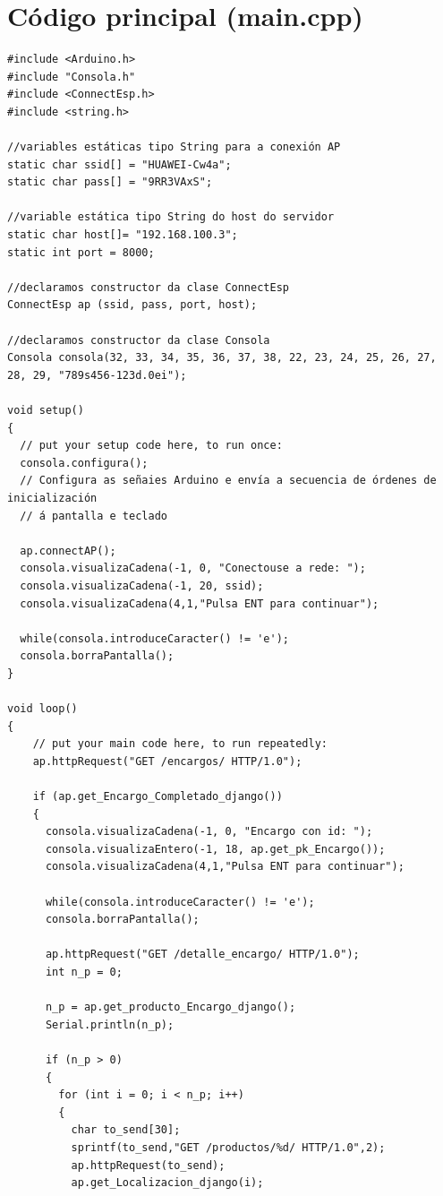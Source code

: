 \documentclass[11pt,twoside]{book}
\begin{document}
\section{Código principal (main.cpp)}

\begin{lstlisting}
#include <Arduino.h>
#include "Consola.h"
#include <ConnectEsp.h>
#include <string.h>

//variables estáticas tipo String para a conexión AP
static char ssid[] = "HUAWEI-Cw4a";
static char pass[] = "9RR3VAxS";

//variable estática tipo String do host do servidor
static char host[]= "192.168.100.3";
static int port = 8000;

//declaramos constructor da clase ConnectEsp
ConnectEsp ap (ssid, pass, port, host);

//declaramos constructor da clase Consola
Consola consola(32, 33, 34, 35, 36, 37, 38, 22, 23, 24, 25, 26, 27, 28, 29, "789s456-123d.0ei");

void setup()
{
  // put your setup code here, to run once:
  consola.configura();
  // Configura as señaies Arduino e envía a secuencia de órdenes de inicialización
  // á pantalla e teclado

  ap.connectAP();
  consola.visualizaCadena(-1, 0, "Conectouse a rede: ");
  consola.visualizaCadena(-1, 20, ssid);
  consola.visualizaCadena(4,1,"Pulsa ENT para continuar");

  while(consola.introduceCaracter() != 'e');
  consola.borraPantalla();
}

void loop()
{
    // put your main code here, to run repeatedly:
    ap.httpRequest("GET /encargos/ HTTP/1.0");

    if (ap.get_Encargo_Completado_django())
    {
      consola.visualizaCadena(-1, 0, "Encargo con id: ");
      consola.visualizaEntero(-1, 18, ap.get_pk_Encargo());
      consola.visualizaCadena(4,1,"Pulsa ENT para continuar");

      while(consola.introduceCaracter() != 'e');
      consola.borraPantalla();

      ap.httpRequest("GET /detalle_encargo/ HTTP/1.0");
      int n_p = 0;

      n_p = ap.get_producto_Encargo_django();
      Serial.println(n_p);

      if (n_p > 0)
      {
        for (int i = 0; i < n_p; i++)
        {
          char to_send[30];
          sprintf(to_send,"GET /productos/%d/ HTTP/1.0",2);
          ap.httpRequest(to_send);
          ap.get_Localizacion_django(i);


\end{lstlisting}
\end{document}
